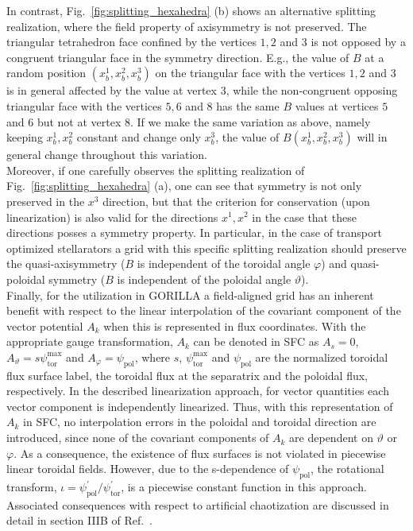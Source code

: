 \documentclass{TheMartianReport}
\begin{document}
%
In contrast, Fig.~\ref{fig:splitting_hexahedra} (b) shows an alternative splitting realization, where the field property of axisymmetry is not preserved. The triangular tetrahedron face confined by the vertices $1,2$ and $3$ is not opposed by a congruent triangular face in the symmetry direction. E.g., the value of $B$ at a random position $(x^1_b,x^2_b,x^3_b)$ on the triangular face with the vertices $1,2$ and $3$ is in general affected by the value at vertex $3$, while the non-congruent opposing triangular face with the vertices $5,6$ and $8$ has the same $B$ values at vertices $5$ and $6$ but not at vertex $8$. If we make the same variation as above, namely keeping $x^1_b,x^2_b$ constant and change only $x^3_b$, the value of $B(x^1_b,x^2_b,x^3_b)$ will in general change throughout this variation.\\
%
Moreover, if one carefully observes the splitting realization of Fig.~\ref{fig:splitting_hexahedra} (a), one can see that symmetry is not only preserved in the $x^3$ direction, but that the criterion for conservation (upon linearization) is also valid for the directions $x^1,x^2$ in the case that these directions posses a symmetry property.  In particular, in the case of transport optimized stellarators\cite{mynick_transport_2006} a grid with this specific splitting realization should preserve the quasi-axisymmetry ($B$ is independent of the toroidal angle $\varphi$) and quasi-poloidal symmetry ($B$ is independent of the poloidal angle $\vartheta$). \\
%
Finally,  for the utilization in GORILLA a field-aligned grid has an inherent benefit with respect to the linear interpolation of the covariant component of the vector potential $A_k$ when this is represented in flux coordinates.
With the appropriate gauge transformation, $A_k$ can be denoted in SFC as $A_s = 0$, $A_\vartheta = s \psi_\text{tor}^\text{max}$ and $A_\varphi= \psi_\text{pol}$, where $s$, $\psi_\text{tor}^\text{max}$ and $\psi_\text{pol}$ are the normalized toroidal flux surface label, the toroidal flux at the separatrix and the poloidal flux, respectively.
In the described linearization approach, for vector quantities each vector component is independently linearized. Thus, with this representation of $A_k$ in SFC, no interpolation errors in the poloidal and toroidal direction are introduced, since none of the covariant components of $A_k$ are dependent on $\vartheta$ or $\varphi$. As a consequence, the existence of flux surfaces is not violated in piecewise linear toroidal fields. However, due to the s-dependence of $\psi_\text{pol}$, the rotational transform, $\iota = \psi^\prime_\text{pol} /  \psi^\prime_\text{tor}$, is a piecewise constant function in this approach. Associated consequences with respect to artificial chaotization are discussed in detail in section IIIB of Ref.~.\\
\end{document}
